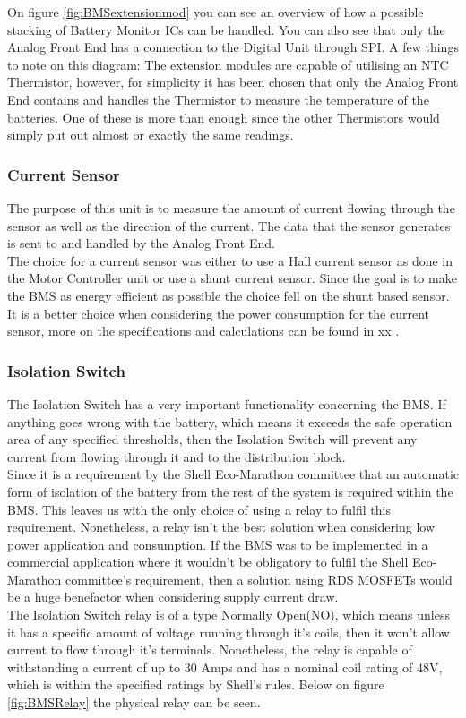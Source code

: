 On figure \ref{fig:BMSextensionmod} you can see an overview of how a possible stacking of Battery Monitor ICs can be handled. You can also see that only the Analog Front End has a connection to the Digital Unit through SPI. A few things to note on this diagram: The extension modules are capable of utilising an NTC Thermistor, however, for simplicity it has been chosen that only the Analog Front End contains and handles the Thermistor to measure the temperature of the batteries. One of these is more than enough since the other Thermistors would simply put out almost or exactly the same readings.

\subsubsection{Current Sensor}
The purpose of this unit is to measure the amount of current flowing through the sensor as well as the direction of the current. The data that the sensor generates is sent to and handled by the Analog Front End. \\
The choice for a current sensor was either to use a Hall current sensor as done in the Motor Controller unit or use a shunt current sensor. Since the goal is to make the BMS as energy efficient as possible the choice fell on the shunt based sensor. It is a better choice when considering the power consumption for the current sensor, more on the specifications and calculations can be found in xx .

\subsubsection{Isolation Switch}
The Isolation Switch has a very important functionality concerning the BMS. If anything goes wrong with the battery, which means it exceeds the safe operation area of any specified thresholds, then the Isolation Switch will prevent any current from flowing through it and to the distribution block. \\
Since it is a requirement by the Shell Eco-Marathon committee that an automatic form of isolation of the battery from the rest of the system is required within the BMS. This leaves us with the only choice of using a relay to fulfil this requirement. Nonetheless, a relay isn't the best solution when considering low power application and consumption. If the BMS was to be implemented in a commercial application where it wouldn't be obligatory to fulfil the Shell Eco-Marathon committee's requirement, then a solution using RDS MOSFETs would be a huge benefactor when considering supply current draw.\\
The Isolation Switch relay is of a type Normally Open(NO), which means unless it has a specific amount of voltage running through it's coils, then it won't allow current to flow through it's terminals. Nonetheless, the relay is  capable of withstanding a current of up to 30 Amps and has a nominal coil rating of 48V, which is within the specified ratings by Shell's rules. Below on figure \ref{fig:BMSRelay} the physical relay can be seen.

